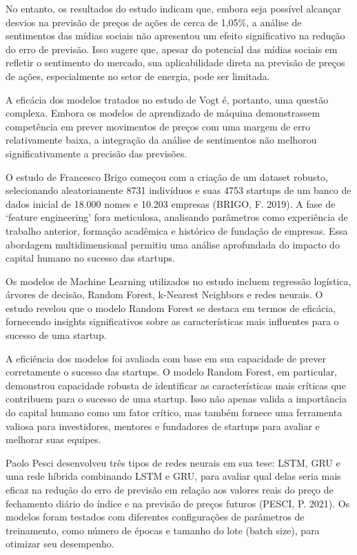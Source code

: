 \documentclass[
]{article}
\begin{document}
No entanto, os resultados do estudo indicam que, embora seja possível
alcançar desvios na previsão de preços de ações de cerca de 1,05\%, a
análise de sentimentos das mídias sociais não apresentou um efeito
significativo na redução do erro de previsão. Isso sugere que, apesar do
potencial das mídias sociais em refletir o sentimento do mercado, sua
aplicabilidade direta na previsão de preços de ações, especialmente no
setor de energia, pode ser limitada.

A eficácia dos modelos tratados no estudo de Vogt é, portanto, uma
questão complexa. Embora os modelos de aprendizado de máquina
demonstrassem competência em prever movimentos de preços com uma margem
de erro relativamente baixa, a integração da análise de sentimentos não
melhorou significativamente a precisão das previsões.

O estudo de Francesco Brigo começou com a criação de um dataset robusto,
selecionando aleatoriamente 8731 indivíduos e suas 4753 startups de um
banco de dados inicial de 18.000 nomes e 10.203 empresas (BRIGO, F.
2019). A fase de `feature engineering' fora meticulosa, analisando
parâmetros como experiência de trabalho anterior, formação acadêmica e
histórico de fundação de empresas. Essa abordagem multidimensional
permitiu uma análise aprofundada do impacto do capital humano no sucesso
das startups.

Os modelos de Machine Learning utilizados no estudo incluem regressão
logística, árvores de decisão, Random Forest, k-Nearest Neighbors e
redes neurais. O estudo revelou que o modelo Random Forest se destaca em
termos de eficácia, fornecendo insights significativos sobre as
características mais influentes para o sucesso de uma startup.

A eficiência dos modelos foi avaliada com base em sua capacidade de
prever corretamente o sucesso das startups. O modelo Random Forest, em
particular, demonstrou capacidade robusta de identificar as
características mais críticas que contribuem para o sucesso de uma
startup. Isso não apenas valida a importância do capital humano como um
fator crítico, mas também fornece uma ferramenta valiosa para
investidores, mentores e fundadores de startups para avaliar e melhorar
suas equipes.

Paolo Pesci desenvolveu três tipos de redes neurais em sua tese: LSTM,
GRU e uma rede híbrida combinando LSTM e GRU, para avaliar qual delas
seria mais eficaz na redução do erro de previsão em relação aos valores
reais do preço de fechamento diário do índice e na previsão de preços
futuros (PESCI, P. 2021). Os modelos foram testados com diferentes
configurações de parâmetros de treinamento, como número de épocas e
tamanho do lote (batch size), para otimizar seu desempenho.
\end{document}
